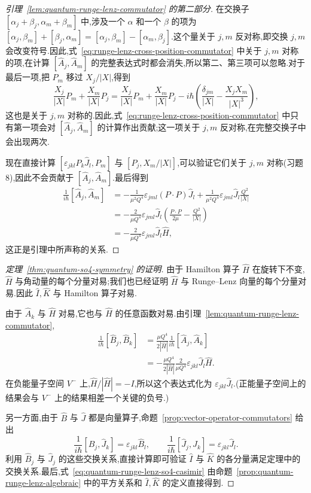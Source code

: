 {\begin{proof}[引理~\ref{lem:quantum-runge-lenz-commutator} 的第二部分]
在交换子 $[\alpha_j+\beta_j,\alpha_m+\beta_m]$ 中,涉及一个 $\alpha$ 和一个 $\beta$ 的项为 $[\alpha_j,\beta_m]+[\beta_j,\alpha_m]=[\alpha_j,\beta_m]-[\alpha_m,\beta_j]$.这个量关于 $j,m$ 反对称,即交换 $j,m$ 会改变符号.因此,式~\eqref{eq:runge-lenz-cross-position-commutator} 中关于 $j,m$ 对称的项,在计算 $[\widehat A_j,\widehat A_m]$ 的完整表达式时都会消失,所以第二、第三项可以忽略.对于最后一项,把 $P_m$ 移过 $X_j/|X|$,得到
\[
 \frac{X_j}{|X|}P_m+\frac{X_m}{|X|}P_j
 =\frac{X_j}{|X|}P_m+\frac{X_m}{|X|}P_j
 -i\hbar\left(\frac{\delta_{jm}}{|X|}-\frac{X_jX_m}{|X|^3}\right),
\label{eq:runge-lenz-symmetric-cross-term}
\]
这也是关于 $j,m$ 对称的.因此,式~\eqref{eq:runge-lenz-cross-position-commutator} 中只有第一项会对 $[\widehat A_j,\widehat A_m]$ 的计算作出贡献;这一项关于 $j,m$ 反对称,在完整交换子中会出现两次.

现在直接计算 $[\varepsilon_{jkl}P_k\widehat J_l,P_m]$ 与 $[P_j,X_m/|X|]$,可以验证它们关于 $j,m$ 对称(习题 8),因此不会贡献于 $[\widehat A_j,\widehat A_m]$.最后得到
\[
\begin{aligned}
 \frac1{i\hbar}[\widehat A_j,\widehat A_m]
 &= -\frac1{\mu^2Q^4}\varepsilon_{jml}(P\cdot P)\widehat J_l
 +\frac1{\mu^2Q^4}\varepsilon_{jml}\widehat J_l\frac{Q^2}{|X|}\\
 &= -\frac2{\mu Q^4}\varepsilon_{jml}\widehat J_l
 \left(\frac{P\cdot P}{2\mu}-\frac{Q^2}{|X|}\right)\\
 &= -\frac2{\mu Q^4}\varepsilon_{jml}\widehat J_l\widehat H,
\end{aligned}
\]
这正是引理中所声称的关系.
\end{proof}

\begin{proof}[定理~\ref{thm:quantum-so4-symmetry} 的证明]
由于 Hamilton 算子 $\widehat H$ 在旋转下不变,$\widehat H$ 与角动量的每个分量对易;我们也已经证明 $\widehat H$ 与 Runge--Lenz 向量的每个分量对易.因此 $\widehat I,\widehat K$ 与 Hamilton 算子对易.

由于 $\widehat A_k$ 与 $\widehat H$ 对易,它也与 $\widehat H$ 的任意函数对易.由引理~\ref{lem:quantum-runge-lenz-commutator},
\[
\begin{aligned}
 \frac1{i\hbar}[\widehat B_j,\widehat B_k]
 &=\frac{\mu Q^4}{2|\widehat H|}\frac1{i\hbar}[\widehat A_j,\widehat A_k]\\
 &=-\frac{\mu Q^4}{2|\widehat H|}\frac2{\mu Q^4}
 \varepsilon_{jkl}\widehat J_l\widehat H.
\end{aligned}
\]
在负能量子空间 $V^-$ 上,$\widehat H/|\widehat H|=-I$,所以这个表达式化为 $\varepsilon_{jkl}\widehat J_l$.(正能量子空间上的结果会与 $V^-$ 上的结果相差一个关键的负号.)

另一方面,由于 $\widehat B$ 与 $\widehat J$ 都是向量算子,命题~\ref{prop:vector-operator-commutators} 给出
\[
 \frac1{i\hbar}[\widehat B_j,\widehat J_k]=\varepsilon_{jkl}\widehat B_l,
 \qquad
 \frac1{i\hbar}[\widehat J_j,\widehat J_k]=\varepsilon_{jkl}\widehat J_l.
\]
利用 $\widehat B_j$ 与 $\widehat J_j$ 的这些交换关系,直接计算即可验证 $\widehat I$ 与 $\widehat K$ 的各分量满足定理中的交换关系.最后,式~\eqref{eq:quantum-runge-lenz-so4-casimir} 由命题~\ref{prop:quantum-runge-lenz-algebraic} 中的平方关系和 $\widehat I,\widehat K$ 的定义直接得到.
\end{proof}
}

